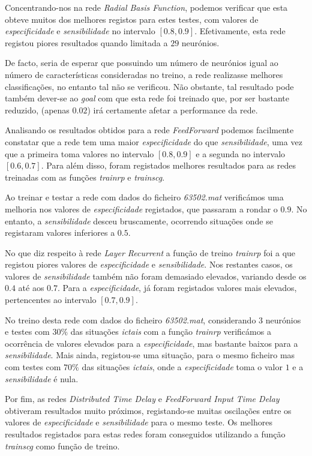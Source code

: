 \documentclass{article}
\begin{document}
Concentrando-nos na rede \emph{Radial Basis Function}, podemos verificar que esta obteve muitos dos melhores registos para estes testes, com valores de \emph{especificidade} e \emph{sensibilidade} no intervalo $[0.8,0.9]$. Efetivamente, esta rede registou piores resultados quando limitada a $29$ neurónios.

De facto, seria de esperar que possuindo um número de neurónios igual ao número de características consideradas no treino, a rede realizasse melhores classificações, no entanto tal não se verificou. Não obstante, tal resultado pode também dever-se ao \emph{goal} com que esta rede foi treinado que, por ser bastante reduzido, (apenas $0.02$) irá certamente afetar a performance da rede.

Analisando os resultados obtidos para a rede \emph{FeedForward} podemos facilmente constatar que a rede tem uma maior \emph{especificidade} do que \emph{sensibilidade}, uma vez que a primeira toma valores no intervalo $[0.8,0.9]$ e a segunda no intervalo $[0.6,0.7]$. Para além disso, foram registados melhores resultados para as redes treinadas com as funções \emph{trainrp} e \emph{trainscg}.

Ao treinar e testar a rede com dados do ficheiro \emph{63502.mat} verificámos uma melhoria nos valores de \emph{especificidade} registados, que passaram a rondar o $0.9$. No entanto, a \emph{sensibilidade} desceu bruscamente, ocorrendo situações onde se registaram valores inferiores a $0.5$.

No que diz respeito à rede \emph{Layer Recurrent} a função de treino \emph{trainrp} foi a que registou piores valores de \emph{especificidade} e \emph{sensibilidade}. Nos restantes casos, os valores de \emph{sensibilidade} também não foram demasiado elevados, variando desde os $0.4$ até aos $0.7$. Para a \emph{especificidade}, já foram registados valores mais elevados, pertencentes ao intervalo $[0.7,0.9]$.

No treino desta rede com dados do ficheiro \emph{63502.mat}, considerando $3$ neurónios e testes com $30\%$ das situações \emph{ictais} com a função \emph{trainrp} verificámos a ocorrência de valores elevados para a \emph{especificidade}, mas bastante baixos para a \emph{sensibilidade}. Mais ainda, registou-se uma situação, para o mesmo ficheiro mas com testes com $70\%$ das situações \emph{ictais}, onde a \emph{especificidade} toma o valor $1$ e a \emph{sensibilidade} é nula.

Por fim, as redes \emph{Distributed Time Delay} e \emph{FeedForward Input Time Delay} obtiveram resultados muito próximos, registando-se muitas oscilações entre os valores de \emph{especificidade} e \emph{sensibilidade} para o mesmo teste. Os melhores resultados registados para estas redes foram conseguidos utilizando a função \emph{trainscg} como função de treino.
\end{document}
